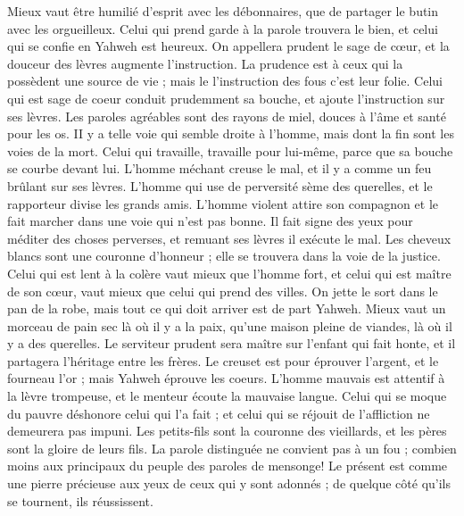 \begin{multicols}{2}
Mieux vaut être humilié d'esprit avec les débonnaires, que de partager le butin avec les orgueilleux.
Celui qui prend garde à la parole trouvera le bien, et celui qui se confie en Yahweh est heureux.
On appellera prudent le sage de cœur, et la douceur des lèvres augmente l'instruction.
La prudence est à ceux qui la possèdent une source de vie ; mais le l'instruction des fous c'est leur folie.
Celui qui est sage de coeur conduit prudemment sa bouche, et ajoute l'instruction sur ses lèvres.
Les paroles agréables sont des rayons de miel, douces à l'âme et santé pour les os.
 II y a telle voie qui semble droite à l'homme, mais dont la fin sont les voies de la mort.
Celui qui travaille, travaille pour lui-même, parce que sa bouche se courbe devant lui.
L'homme méchant creuse le mal, et il y a comme un feu brûlant sur ses lèvres.
L'homme qui use de perversité sème des querelles, et le rapporteur divise les grands amis.
L'homme violent attire son compagnon et le fait marcher dans une voie qui n'est pas bonne.
Il fait signe des yeux pour méditer des choses perverses, et remuant ses lèvres il exécute le mal.
Les cheveux blancs sont une couronne d'honneur ; elle se trouvera dans la voie de la justice.
Celui qui est lent à la colère vaut mieux que l'homme fort, et celui qui est maître de son cœur, vaut mieux que celui qui prend des villes.
On jette le sort dans le pan de la robe, mais tout ce qui doit arriver est de part Yahweh.
\VerseOne{}Mieux vaut un morceau de pain sec là où il y a la paix, qu'une maison pleine de viandes, là où il y a des querelles.
Le serviteur prudent sera maître sur l'enfant qui fait honte, et il partagera l'héritage entre les frères.
Le creuset est pour éprouver l'argent, et le fourneau l'or ; mais Yahweh éprouve les coeurs.
L'homme mauvais est attentif à la lèvre trompeuse, et le menteur écoute la mauvaise langue.
Celui qui se moque du pauvre déshonore celui qui l'a fait ; et celui qui se réjouit de l'affliction ne demeurera pas impuni.
Les petits-fils sont la couronne des vieillards, et les pères sont la gloire de leurs fils.
La parole distinguée ne convient pas à un fou ; combien moins aux principaux du peuple des paroles de mensonge!
Le présent est comme une pierre précieuse aux yeux de ceux qui y sont adonnés ; de quelque côté qu'ils se tournent, ils réussissent.

\end{multicols}
